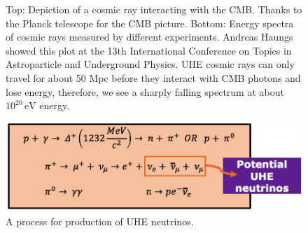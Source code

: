 \begin{figure}
\centering
{}\quad
{}
\caption{Top: Depiction of a cosmic ray interacting with the CMB. Thanks to the Planck telescope for the CMB picture. Bottom: Energy spectra of cosmic rays measured by different experiments. Andreas Haungs showed this plot at the 13th International Conference on Topics in Astroparticle and Underground Physics. UHE cosmic rays can only travel for about 50 Mpc before they interact with CMB photons and lose energy, therefore, we see a sharply falling spectrum at about $10^{20}\,\mbox{eV}$ energy.}
\label{cr}
\end{figure}

\begin{figure}
\centering
\includegraphics[width=1.0\textwidth]{figures/uhe_process.png}
\caption{A process for production of UHE neutrinos.}
\label{uhe_process}
\end{figure}

